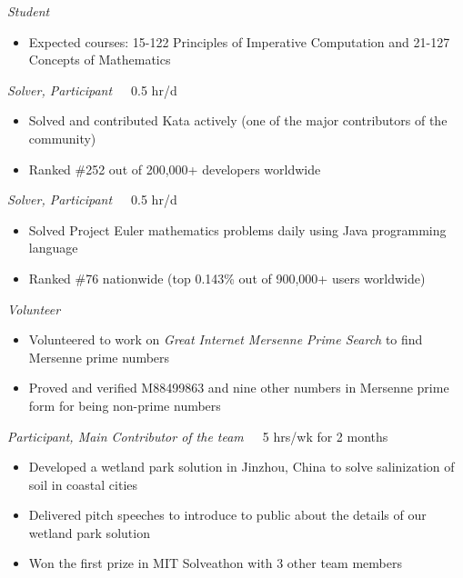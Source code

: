 \documentclass{resume}
\begin{document}
\emph{Student}
\begin{itemize}
  \item Expected courses: 15-122 Principles of Imperative Computation and 21-127 Concepts of Mathematics
\end{itemize}

\emph{Solver, Participant}\ \ \ 0.5 hr/d
\begin{itemize}
  \item Solved and contributed Kata actively (one of the major contributors of the community)
  \item Ranked \#252 out of 200,000+ developers worldwide
\end{itemize}

\emph{Solver, Participant}\ \ \ 0.5 hr/d
\begin{itemize}
  \item Solved Project Euler mathematics problems daily using Java programming language
  \item Ranked \#76 nationwide (top 0.143\% out of 900,000+ users worldwide)
\end{itemize}

\emph{Volunteer}
\begin{itemize}
  \item Volunteered to work on \emph{Great Internet Mersenne Prime Search} to find Mersenne prime numbers
  \item Proved and verified M88499863 and nine other numbers in Mersenne prime form for being non-prime numbers
\end{itemize}

\emph{Participant, Main Contributor of the team}\ \ \ 5 hrs/wk for 2 months
\begin{itemize}
  \item Developed a wetland park solution in Jinzhou, China to solve salinization of soil in coastal cities
  \item Delivered pitch speeches to introduce to public about the details of our wetland park solution
  \item Won the first prize in MIT Solveathon with 3 other team members
\end{itemize}
\end{document}

